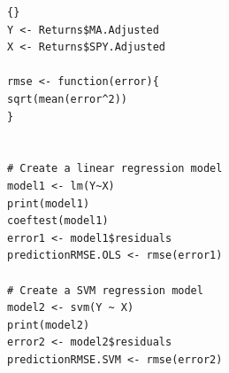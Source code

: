 %			
%			
%			
%			
%	
\begin{lstlisting}[title={‘Código R: Función RMSE y modelos de regresion lineal, estándar y SVM},basicstyle=\ttfamily]{}
Y <- Returns$MA.Adjusted
X <- Returns$SPY.Adjusted

rmse <- function(error){
sqrt(mean(error^2))
}


# Create a linear regression model
model1 <- lm(Y~X)
print(model1)
coeftest(model1)
error1 <- model1$residuals
predictionRMSE.OLS <- rmse(error1)

# Create a SVM regression model
model2 <- svm(Y ~ X)
print(model2)
error2 <- model2$residuals
predictionRMSE.SVM <- rmse(error2)
\end{lstlisting}

%	
%	
%			
%			

